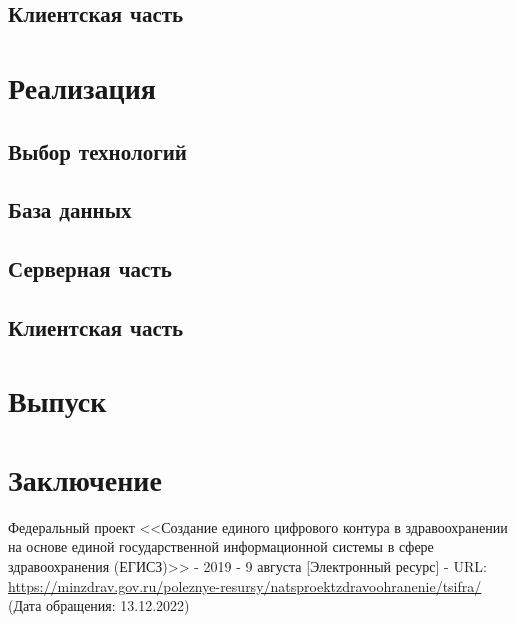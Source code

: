 \documentclass[a4paper,article]{article}
\begin{document}
    \subsection{Клиентская часть}

    \newpage

    \section{Реализация}

    \subsection{Выбор технологий}

    \subsection{База данных}

    \subsection{Серверная часть}

    \subsection{Клиентская часть}

    \newpage

    \section{Выпуск}

    \newpage

    \section*{Заключение}

    \newpage


    \begin{thebibliography}{}
         Федеральный проект <<Создание единого цифрового контура в здравоохранении на основе единой государственной информационной системы в сфере здравоохранения (ЕГИСЗ)>> - 2019 - 9 августа [Электронный ресурс] - URL: \url{https://minzdrav.gov.ru/poleznye-resursy/natsproektzdravoohranenie/tsifra/} (Дата обращения: 13.12.2022)
    \end{thebibliography}
\end{document}

